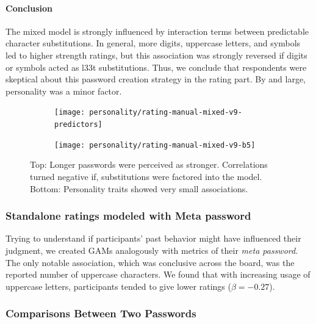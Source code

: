 \paragraph{Conclusion} The mixed model is strongly influenced by interaction terms between predictable character substitutions. In general, more digits, uppercase letters, and symbols led to higher strength ratings, but this association was strongly reversed if digits or symbols acted as l33t substitutions. Thus, we conclude that respondents were skeptical about this password creation strategy in the rating part. By and large, personality was a minor factor.


\begin{figure}[htbp]
	\centering
	\begin{subfigure}[t]{\linewidth}
		\texttt{[image: personality/rating-manual-mixed-v9-predictors]}
	\end{subfigure}
	\begin{subfigure}[b]{\linewidth}
	\texttt{[image: personality/rating-manual-mixed-v9-b5]}
	\end{subfigure}
	\caption{\label{fig:personality:study2:rating-mixed-model} Top: Longer passwords were perceived as stronger. Correlations turned negative if, substitutions were factored into the model. Bottom: Personality traits showed very small associations.}
\end{figure}

\subsubsection{Standalone ratings modeled with Meta password}
Trying to understand if participants' past behavior might have influenced their judgment, we created GAMs analogously with metrics of their \textit{meta password}. The only notable association, which was conclusive across the board, was the reported number of uppercase characters. We found that with increasing usage of uppercase letters, participants tended to give lower ratings ($\beta=-0.27$). 

\subsubsection{Comparisons Between Two Passwords}

